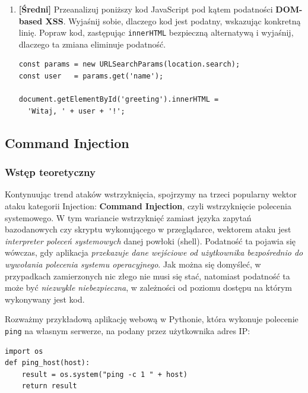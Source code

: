 \documentclass[12pt,a4paper]{article}
\begin{document}
\begin{enumerate}
    \item \textbf{[Średni]} Przeanalizuj poniższy kod JavaScript pod kątem podatności \textbf{DOM-based XSS}. Wyjaśnij sobie,
    dlaczego kod jest podatny, wskazując konkretną linię. Popraw kod, zastępując \texttt{innerHTML} bezpieczną
    alternatywą i wyjaśnij, dlaczego ta zmiana eliminuje podatność.
    \begin{tcolorbox}
    \begin{verbatim}
const params = new URLSearchParams(location.search);
const user   = params.get('name');
 
document.getElementById('greeting').innerHTML =
  'Witaj, ' + user + '!';
    \end{verbatim}
    \end{tcolorbox}
 
 

 
\end{enumerate}


\subsection{Command Injection}

\subsubsection{Wstęp teoretyczny}
Kontynuując trend ataków wstrzyknięcia, spojrzymy na trzeci popularny wektor ataku kategorii Injection: \textbf{Command Injection}, czyli wstrzyknięcie polecenia systemowego.
W tym wariancie wstrzyknięć zamiast języka zapytań bazodanowych czy skryptu wykonującego w przeglądarce, wektorem ataku jest \emph{interpreter poleceń systemowych} danej powłoki (shell). 
Podatność ta pojawia się wówczas, gdy aplikacja \emph{przekazuje dane wejściowe od użytkownika bezpośrednio do wywołania polecenia systemu operacyjnego}.
Jak można się domyśleć, w przypadkach zamierzonych nic złego nie musi się stać, natomiast podatność ta może być \emph{niezwykle niebezpieczna}, w zależności od poziomu dostępu 
na którym wykonywany jest kod.

Rozważmy przykładową aplikację webową w Pythonie, która wykonuje polecenie \texttt{ping} na własnym serwerze, na podany przez użytkownika adres IP:

\begin{tcolorbox}
\begin{verbatim}
import os
def ping_host(host):
    result = os.system("ping -c 1 " + host)
    return result
\end{verbatim}
\end{tcolorbox}
\end{document}
